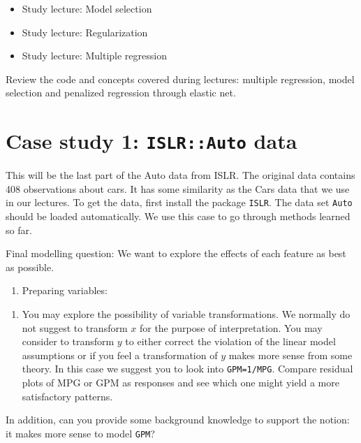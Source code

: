 \documentclass[
]{article}
\providecommand{\tightlist}{%
  \setlength{\itemsep}{0pt}\setlength{\parskip}{0pt}}
\begin{document}
\begin{itemize}
\tightlist
\item
  Study lecture: Model selection
\item
  Study lecture: Regularization
\item
  Study lecture: Multiple regression
\end{itemize}

Review the code and concepts covered during lectures: multiple
regression, model selection and penalized regression through elastic
net.

\hypertarget{case-study-1-islrauto-data}{%
\section{\texorpdfstring{Case study 1: \texttt{ISLR::Auto}
data}{Case study 1: ISLR::Auto data}}\label{case-study-1-islrauto-data}}

This will be the last part of the Auto data from ISLR. The original data
contains 408 observations about cars. It has some similarity as the Cars
data that we use in our lectures. To get the data, first install the
package \texttt{ISLR}. The data set \texttt{Auto} should be loaded
automatically. We use this case to go through methods learned so far.

Final modelling question: We want to explore the effects of each feature
as best as possible.

\begin{enumerate}
\def\labelenumi{\arabic{enumi})}
\tightlist
\item
  Preparing variables:
\end{enumerate}

\begin{enumerate}
\def\labelenumi{\alph{enumi})}
\tightlist
\item
  You may explore the possibility of variable transformations. We
  normally do not suggest to transform \(x\) for the purpose of
  interpretation. You may consider to transform \(y\) to either correct
  the violation of the linear model assumptions or if you feel a
  transformation of \(y\) makes more sense from some theory. In this
  case we suggest you to look into \texttt{GPM=1/MPG}. Compare residual
  plots of MPG or GPM as responses and see which one might yield a more
  satisfactory patterns.
\end{enumerate}

In addition, can you provide some background knowledge to support the
notion: it makes more sense to model \texttt{GPM}?
\end{document}
